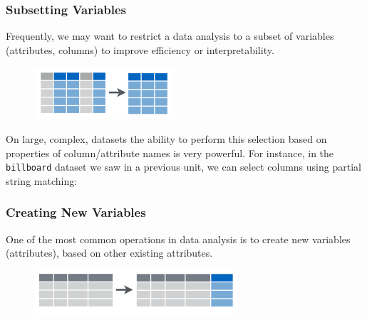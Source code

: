\documentclass[]{article}
\newenvironment{Shaded}{\begin{snugshade}}{\end{snugshade}}
\newcommand{\KeywordTok}[1]{\textcolor[rgb]{0.13,0.29,0.53}{\textbf{{#1}}}}
\newcommand{\StringTok}[1]{\textcolor[rgb]{0.31,0.60,0.02}{{#1}}}
\newcommand{\CommentTok}[1]{\textcolor[rgb]{0.56,0.35,0.01}{\textit{{#1}}}}
\newcommand{\NormalTok}[1]{{#1}}
\theoremstyle{definition}
\theoremstyle{definition}
\theoremstyle{remark}
\begin{document}
\subsubsection{Subsetting Variables}\label{subsetting-variables}

Frequently, we may want to restrict a data analysis to a subset of
variables (attributes, columns) to improve efficiency or
interpretability.

\begin{figure}[htbp]
\centering
\includegraphics{img/select.png}
\caption{}
\end{figure}

\begin{Shaded}
\end{Shaded}

On large, complex, datasets the ability to perform this selection based
on properties of column/attribute names is very powerful. For instance,
in the \texttt{billboard} dataset we saw in a previous unit, we can
select columns using partial string matching:

\begin{Shaded}
\end{Shaded}

\subsubsection{Creating New Variables}\label{creating-new-variables}

One of the most common operations in data analysis is to create new
variables (attributes), based on other existing attributes.

\begin{figure}[htbp]
\centering
\includegraphics{img/mutate.png}
\caption{}
\end{figure}
\end{document}
